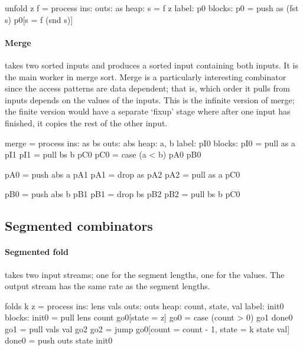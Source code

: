 \begin{code}
unfold z f = process
     ins: 
    outs: as
    heap: {s = f z}
   label: p0
  blocks: p0 = push as (fst s) p0[s = f (snd s)]
\end{code}

\paragraph{Merge} takes two sorted inputs and produces a sorted input containing both inputs.
It is the main worker in merge sort.
Merge is a particularly interesting combinator since the access patterns are data dependent; that is, which order it pulls from inputs depends on the values of the inputs.
This is the infinite version of merge; the finite version would have a separate `fixup' stage where after one input has finished, it copies the rest of the other input.

\begin{code}
merge = process
     ins: as bs
    outs: abs
    heap: {a, b}
   label: pI0
  blocks: pI0 = pull as a  pI1
          pI1 = pull bs b  pC0
          pC0 = case (a < b) pA0 pB0

          pA0 = push abs a pA1
          pA1 = drop as    pA2
          pA2 = pull as  a pC0

          pB0 = push abs b pB1
          pB1 = drop bs    pB2
          pB2 = pull bs  b pC0
\end{code}

\subsection{Segmented combinators}

\paragraph{Segmented fold}
takes two input streams; one for the segment lengths, one for the values.
The output stream has the same rate as the segment lengths.

\begin{code}
folds k z = process
     ins: lens vals
    outs: outs
    heap: {count, state, val}
   label: init0
  blocks: init0 = pull lens count go0[state = z]
          go0   = case (count > 0) go1 done0
          go1   = pull vals val    go2
          go2   = jump go0[count = count - 1, state = k state val]
          done0 = push outs state init0
\end{code}


